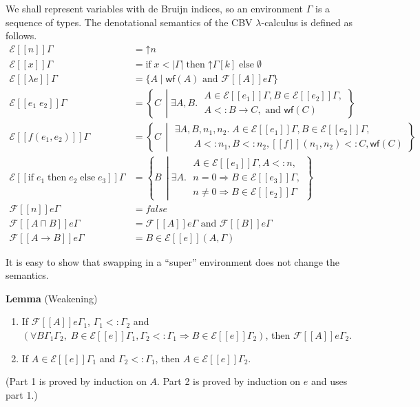 \documentclass{article}
\newcommand{\app}[0]{\;}
\newcommand{\IF}[0]{\mathrm{if}\;}
\newcommand{\THEN}[0]{\;\mathrm{then}\;}
\newcommand{\ELSE}[0]{\;\mathrm{else}\;}
\newcommand{\SEM}[1]{[\![ #1 ]\!]}
\newcommand{\ESEM}[1]{\mathcal{E}\SEM{#1}}
\newcommand{\FSEM}[1]{\mathcal{F}\SEM{#1}}
\newcommand{\WF}[1]{\mathsf{wf}(#1)}
\newcommand{\UP}[1]{\mathord{\uparrow} #1}
\begin{document}
We shall represent variables with de Bruijn indices, so an environment
$\Gamma$ is a sequence of types.  The denotational semantics of the CBV
$\lambda$-calculus is defined as follows.
\begin{align*}
  \ESEM{n}\Gamma &= \UP{n} \\
  \ESEM{x}\Gamma &=  \IF x < |\Gamma| \THEN \UP{\Gamma[k]} \ELSE \emptyset \\
  \ESEM{\lambda e }\Gamma &= \{ A \mid \WF{A} \text{ and } \FSEM{A}e\Gamma \} \\
  \ESEM{e_1\app e_2}\Gamma &= \left\{ C\, \middle| \exists A,B.\;
      \begin{array}{l}
      A \in \ESEM{e_1}\Gamma,
      B \in \ESEM{e_2}\Gamma,\\
      A <: B \to C, \text{ and } \WF{C}
      \end{array}
        \right\} \\
  \ESEM{f(e_1,e_2)}\Gamma &=
      \left\{ C\, \middle| \begin{array}{l}
       \exists A,B,n_1,n_2.\; A \in \ESEM{e_1}\Gamma, B \in \ESEM{e_2}\Gamma,\\
      \qquad A <: n_1, B <: n_2, \SEM{f}(n_1,n_2) <: C, \WF{C} 
      \end{array} \right\} \\
  \ESEM{\IF e_1 \THEN e_2 \ELSE e_3}\Gamma &=
    \left\{ B\, \middle| \exists A.\;
    \begin{array}{l}A \in \ESEM{e_1}\Gamma, A <: n,\\
           n = 0 \Rightarrow B \in \ESEM{e_3}\Gamma,\\
           n \neq 0 \Rightarrow B \in \ESEM{e_2}\Gamma
    \end{array}
    \right\}
    \\[2ex]
   \FSEM{n}e\Gamma &= \mathit{false} \\
   \FSEM{A \sqcap B}e \Gamma &= \FSEM{A}e\Gamma \text{ and } \FSEM{B}e\Gamma\\
   \FSEM{A \to B}e \Gamma &= B \in \ESEM{e} (A, \Gamma)
\end{align*}

It is easy to show that swapping in a ``super'' environment does not
change the semantics.

\noindent \textbf{Lemma} (Weakening)
\begin{enumerate}
\item If $\FSEM{A}e \Gamma_1$, $\Gamma_1 <: \Gamma_2$ and
  $(\forall B \Gamma_1 \Gamma_2,\; B \in \ESEM{e}\Gamma_1, \Gamma_2 <: \Gamma_1
  \Rightarrow B \in \ESEM{e}\Gamma_2)$, then
  $\FSEM{A}e \Gamma_2$.
\item If $A \in \ESEM{e}\Gamma_1$ and $\Gamma_2 <: \Gamma_1$,
  then $A \in \ESEM{e}\Gamma_2$.
\end{enumerate}
(Part 1 is proved by induction on $A$. Part 2 is proved by induction
on $e$ and uses part 1.) \\
\end{document}
